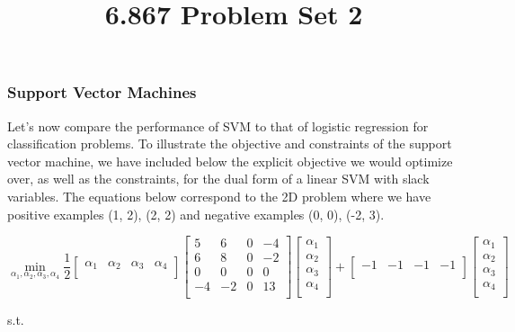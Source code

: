 \documentclass[10pt]{article}
\begin{document}
	\title{6.867 Problem Set 2}
	\maketitle
	
\subsubsection*{Support Vector Machines}

Let's now compare the performance of SVM to that of logistic regression for classification problems. To illustrate the objective and constraints of the support vector machine, we have included below the explicit objective we would optimize over, as well as the constraints, for the dual form of a linear SVM with slack variables. The equations below correspond to the 2D problem where we have positive examples (1, 2), (2, 2) and negative examples (0, 0), (-2, 3).

\[
\min_{\alpha_1, \alpha_2, \alpha_3, \alpha_4}
\frac{1}{2}
\begin{bmatrix}
    \alpha_1 & \alpha_2 & \alpha_3 & \alpha_4 \\
\end{bmatrix}
\begin{bmatrix}
    5       & 6 & 0 & -4 \\
    6       & 8 & 0 & -2 \\
    0       & 0 & 0 & 0 \\
    -4       & -2 & 0 & 13 \\
\end{bmatrix}
\begin{bmatrix}
    \alpha_1 \\
    \alpha_2 \\
    \alpha_3 \\
    \alpha_4 \\
\end{bmatrix} 
+
\begin{bmatrix}
    -1       & -1 & -1 & -1 \\
\end{bmatrix}
\begin{bmatrix}
    \alpha_1 \\
    \alpha_2 \\
    \alpha_3 \\
    \alpha_4 \\
\end{bmatrix} 
\]

\begin{center}
s.t.
\end{center}
\end{document}
